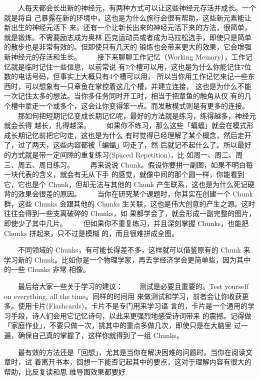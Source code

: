 \documentclass[11pt]{ctexart}
\begin{document}
{{{{　　人每天都会长出新的神经元，有两种方式可以让这些神经元存活并成长。一个就是将自
己暴露在新的环境中，这也是为什么旅行会很有帮助，这些新元素能让新出生的神经元活下
来。还有一个让新长出来的神经元活下来的方法，很简单，就是锻炼。不需要励志成为奥林
匹克运动员或者成为马拉松选手，即使只是简单的散步也是非常有效的。但即使只有几天的
锻炼也会带来更大的效果，它会增强新神经元的存活和生长。
　　接下来聊聊工作记忆（Working Memory），工作记忆就是临时记住一些信息，以前常说
有7个槽可以用，这也是为什么你能记住7位数的电话号码，但事实上大概只有4个槽可以用，
所以当你用工作记忆来记一些东西时，可以想象有一只章鱼在掌控着这几个槽，并建立连接，
这也是为什么不能一次记住太多的想法。当你多任务同时开工时，相当于把章鱼的触角从仅
有的几个槽中拿走一个或多个，这会让你变得笨一点。而发散模式则是有更多的连接。
　　那如何把短期记忆变成长期记忆呢，最好的方法就是练习，练得越多，神经元就会长得
越长，扎得越深。
　　如果你不练习，那么这些「蝙蝠」就会在模式形成长期记忆前把它叼走，这也是为什么
有时觉得已经理解了某个概念，然后走开了，过了两天，这些内容都被「蝙蝠」叼走了，然
后就记不起什么了。所以最好的方式就是带一定间隙的重复练习(Spaced Repetition)，比
如周一、周二、周三、周五、周日练习。
　　再来说说 Chunk。假设你要拼一副图，如果不明白每一块代表的含义，就会有无从下手
的感觉，就像中间的那个圆一样，你能看到它，它也是个 Chunk，但却无法与其他的 Chunk
产生联系，这也是为什么死记硬背的效果会很差的原因。
　　当你在研究某个课题时，你其实在创建一个 Chunk 群，这些 Chunks 会跟其他的
Chunks 生关联，这也是伟大创意的产生之源。这时往往会得到一些支离破碎的 Chunks，如
果都学会了，就会形成一副完整的图片，即使少了其中几片。
　　但如果你不重复练习，并且深刻掌握 Chunks，也能把 Chunks 拼起来，只不过是模糊
的，而且很难拼成全图。

　　不同领域的 Chunks，有可能长得差不多，这样就可以借鉴原有的 Chunk 来学习新的
Chunk。比如你是一个物理学家，再去学经济学会更简单些，因为其中的一些 Chunks 非常
相像。

　　最后给大家一些关于学习的建议：
　　测试是必要且重要的。Test yourself on everything, all the time。同样的时间用
来做测试和学习，前者会让你收获更多。使用卡片(Flashcards)，卡片不是专门用来学习语
言的，卡片是一个通用的学习手段，诗人们会用它记忆诗句，以此来更强烈地感受诗词带来
的震撼。记得做「家庭作业」，不要只做一次，挑其中的重点多做几次，即使只是在大脑里
过一遍，确保自己真的掌握了，这样你就得到了一组 Chunks。

　　最有效的方法还是「回想」，尤其是当你在解决困难的问题时。当你在阅读文章时，试
着离开书本，回想一下能否记起其中的要点，这对于理解内容有很大的帮助，比反复读和思
维导图效果都要好.

}}}}
\end{document}
